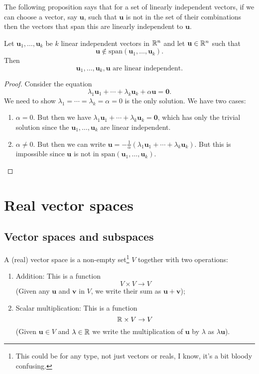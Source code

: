 \documentclass[10pt, a4paper]{article}
\newcommand{\mbf}[1]{\mathbf{#1}}
\begin{document}
The following proposition says that for a set of linearly independent vectors,
if we can choose a vector,
say $\mbf{u}$,
such that $\mbf{u}$ is not in the set of their combinations then the vectors that span this are linearly independent to $\mbf{u}$.

\begin{proposition}
    Let $\mbf{u}_1, \dotsc, \mbf{u}_k$ be $k$ linear independent vectors in $\mathbb{R} ^ n$ and let $\mbf{u} \in \R ^ n$ such that
    \[
    \mbf{u} \notin \mathrm{span}(\mbf{u}_1, \dotsc, \mbf{u}_k).
    \]
    Then
    \[
    \mbf{u}_1, \dotsc, \mbf{u}_k, \mbf{u}\text{ are linear independent}.
    \]
    \begin{proof}
        Consider the equation
        \[
        \lambda_1\mbf{u}_1 + \dotsi + \lambda_k\mbf{u}_k + \alpha\mbf{u} = \mbf{0}.
        \]
        We need to show $\lambda_1 = \dotsi = \lambda_k = \alpha = 0$ is the only solution.
        We have two cases:
        \begin{enumerate}[label = \arabic*)]
            \item $\alpha = 0$.
            But then we have $\lambda_1\mbf{u}_1 + \dotsi + \lambda_k\mbf{u}_k = \mbf{0}$,
            which has only the trivial solution since the $\mbf{u}_1, \dotsc, \mbf{u}_k$ are linear independent.
            \item $\alpha \neq 0$.
            But then we can write $\mbf{u} = -\frac{1}{\alpha}(\lambda_1\mbf{u}_1 + \dotsi + \lambda_k\mbf{u}_k)$.
            But this is impossible since $\mbf{u}$ is not in $\mathrm{span}(\mbf{u}_1, \dotsc, \mbf{u}_k)$.
        \end{enumerate}
    \end{proof}
\end{proposition}

\newpage

\section{Real vector spaces}

\subsection{Vector spaces and subspaces}
A (real) vector space is a non-empty set\footnote{This could be for any type,
not just vectors or reals,
I know,
it's a bit bloody confusing.}
$V$ together with two operations:
\begin{enumerate}[label = (\roman*)]
    \item Addition:
    This is a function
    \[
    V \times V \rightarrow V
    \]
    (Given any $\mbf{u}$ and $\mbf{v}$ in $V$,
    we write their sum as $\mbf{u + v}$);
    \item Scalar multiplication:
    This is a function
    \[
    \mathbb{R} \times V \rightarrow V
    \]
    (Given $\mbf{u} \in V$ and $\lambda \in \mathbb{R}$ we write the multiplication of $\mbf{u}$ by $\lambda$ as $\lambda\mbf{u}$).
\end{enumerate}
\end{document}
